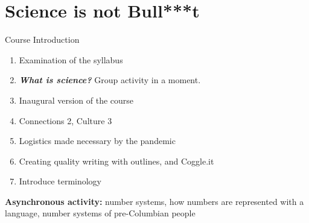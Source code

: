 \documentclass{beamer}
\begin{document}
\section{Science is not Bull***t}

\begin{frame}{Course Introduction}
\begin{enumerate}
\item Examination of the syllabus
\item \textit{\textbf{\alert{What is science?}}} Group activity in a moment.
\item Inaugural version of the course
\item Connections 2, Culture 3
\item Logistics made necessary by the pandemic
\item Creating quality writing with outlines, and Coggle.it
\item Introduce terminology
\end{enumerate}
\alert{\textbf{Asynchronous activity:}} number systems, how numbers are represented with a language, number systems of pre-Columbian people
\end{frame}
\end{document}
